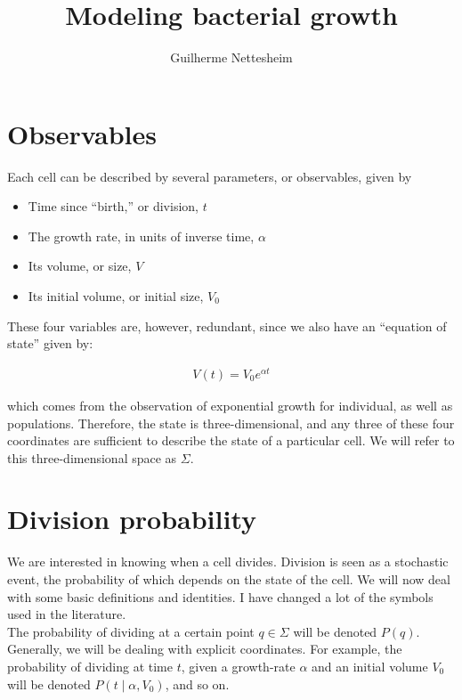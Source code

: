 \documentclass{article}
\author{Guilherme Nettesheim}
\title{Modeling bacterial growth}
\begin{document}
\maketitle

\section{Observables}

Each cell can be described by several parameters, or observables, given by

\begin{itemize}
	\item Time since ``birth,'' or division, $t$
	\item The growth rate, in units of inverse time, $\alpha$
	\item Its volume, or size, $V$
	\item Its initial volume, or initial size, $V_0$
\end{itemize}

These four variables are, however, redundant, since we also have an ``equation of state'' given by:

\begin{align} \label{eqOfState}
V(t) = V_0 e^{\alpha t}
\end{align}

which comes from the observation of exponential growth for individual, as well as populations. Therefore, the state is three-dimensional, and any three of these four coordinates are sufficient to describe the state of a particular cell. We will refer to this three-dimensional space as $\Sigma$.


\section{Division probability}

We are interested in knowing when a cell divides. Division is seen as a stochastic event, the probability of which depends on the state of the cell. We will now deal with some basic definitions and identities. I have changed a lot of the symbols used in the literature.\\

The probability of dividing at a certain point $q \in \Sigma$ will be denoted $P(q)$. Generally, we will be dealing with explicit coordinates. For example, the probability of dividing at time $t$, given a growth-rate $\alpha$ and an initial volume $V_0$ will be denoted $P(t \mid \alpha, V_0)$, and so on.\\
\end{document}
